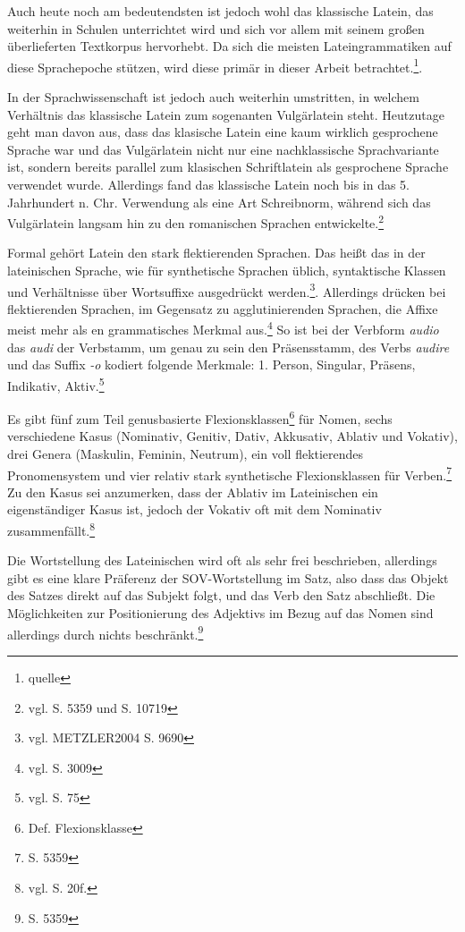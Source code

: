 \documentclass[12pt,abstract=on]{scrreprt}
\begin{document}
Auch heute noch am bedeutendsten ist jedoch wohl das klassische Latein, das weiterhin in Schulen unterrichtet wird und sich vor allem mit seinem großen überlieferten Textkorpus hervorhebt. Da sich die meisten Lateingrammatiken auf diese Sprachepoche stützen, wird diese primär in dieser Arbeit betrachtet.\footnote{quelle}. \par
In der Sprachwissenschaft ist jedoch auch weiterhin umstritten, in welchem Verhältnis das klassische Latein zum sogenanten Vulgärlatein steht. Heutzutage geht man davon aus, dass das klasische Latein eine kaum wirklich gesprochene Sprache war und das Vulgärlatein nicht nur eine nachklassische Sprachvariante ist, sondern bereits parallel zum klasischen Schriftlatein als gesprochene Sprache verwendet wurde. Allerdings fand das klassische Latein noch bis in das 5. Jahrhundert n. Chr. Verwendung als eine Art Schreibnorm, während sich das Vulgärlatein langsam hin zu den romanischen Sprachen entwickelte.\footnote{vgl. \cite{METZLER2004} S. 5359 und S. 10719} \par
Formal gehört Latein den stark flektierenden Sprachen. Das heißt das in der lateinischen Sprache, wie für synthetische Sprachen üblich, syntaktische Klassen und Verhältnisse über Wortsuffixe ausgedrückt werden.\footnote{vgl. METZLER2004 S. 9690}. Allerdings drücken bei flektierenden Sprachen, im Gegensatz zu agglutinierenden Sprachen, die Affixe meist mehr als en grammatisches Merkmal aus.\footnote{vgl. \cite{METZLER2004} S. 3009} So ist bei der Verbform \textit{audio} das \textit{audi} der Verbstamm, um genau zu sein den Präsensstamm, des Verbs \textit{audire} und das Suffix \textit{-o} kodiert folgende Merkmale: 1. Person, Singular, Präsens, Indikativ, Aktiv.\footnote{vgl. \cite{BAYER-LINDAUER1994} S. 75} \par
Es gibt fünf zum Teil genusbasierte Flexionsklassen\footnote{Def. Flexionsklasse} für Nomen, sechs verschiedene Kasus (Nominativ, Genitiv, Dativ, Akkusativ, Ablativ und Vokativ), drei Genera (Maskulin, Feminin, Neutrum), ein voll flektierendes Pronomensystem und vier relativ stark synthetische Flexionsklassen für Verben.\footnote{\cite{METZLER2004} S. 5359} Zu den Kasus sei anzumerken, dass der Ablativ im Lateinischen ein eigenständiger Kasus ist, jedoch der Vokativ oft mit dem Nominativ zusammenfällt.\footnote{vgl. \cite{BAYER-LINDAUER1994} S. 20f.} \par
Die Wortstellung des Lateinischen wird oft als sehr frei beschrieben, allerdings gibt es eine klare Präferenz der SOV-Wortstellung im Satz, also dass das Objekt des Satzes direkt auf das Subjekt folgt, und das Verb den Satz abschließt. Die Möglichkeiten zur Positionierung des Adjektivs im Bezug auf das Nomen sind allerdings durch nichts beschränkt.\footnote{\cite{METZLER2004} S. 5359}
\end{document}
